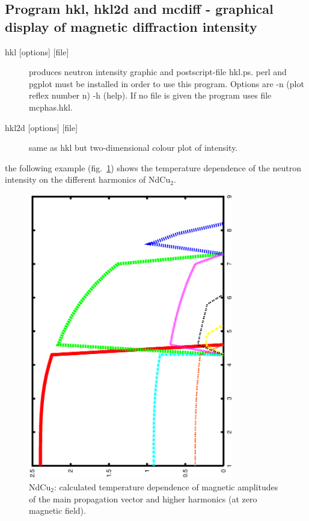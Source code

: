 \subsection{Program {\prg hkl}, {\prg hkl2d} and {\prg mcdiff} - graphical %
display of magnetic diffraction intensity}
\begin{description} 
\item [{{\prg hkl} [options] [file]} ]                   produces neutron intensity graphic
 and postscript-file {\prg hkl.ps}. {\prg perl} and
{\prg pgplot} must be installed in order to use this program.
 Options are -n (plot reflex number n)
-h (help). If no file is given the program uses file {\prg mcphas.hkl}.
\item [{{\prg hkl2d} [options] [file]} ]   same as {\prg hkl} but two-dimensional colour %
plot of intensity.
\end{description} 
the following example (fig.~\ref{neutintgraphic}) shows the temperature dependence of the neutron intensity
on the different harmonics of NdCu$_2$.

\begin{figure}[htb]%
\begin{center}\leavevmode
\includegraphics[angle=-90, width=0.8\textwidth]{figsrc/ndcu2b/resultss/hkl.ps}
\end{center}
\caption{NdCu$_2$: calculated temperature dependence of magnetic amplitudes of the
main propagation vector and higher harmonics (at zero magnetic field).}
\label{neutintgraphic}
\end{figure}

